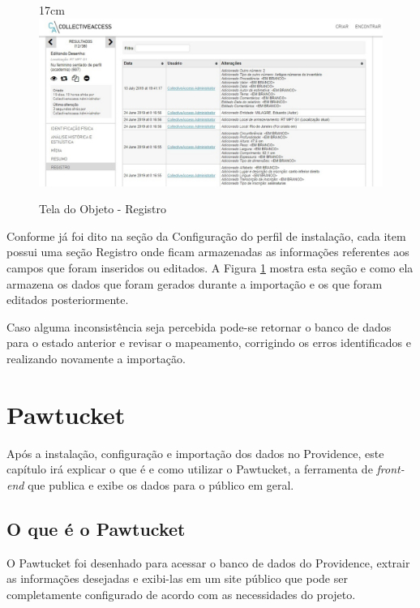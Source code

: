 \documentclass[a4paper,12pt,oneside,onecolumn,final,fleqn]{repUERJ}
\begin{document}
\begin{figure}[!ht]{17cm}
	\includegraphics[width=15cm, left]{figuras/tela_reg.jpg}
	\caption{Tela do Objeto - Registro} \label{fig:tela_reg}
\end{figure}

Conforme já foi dito na seção da Configuração do perfil de instalação, cada item possui uma seção Registro onde ficam armazenadas as informações referentes aos campos que foram inseridos ou editados. A Figura \ref{fig:tela_reg} mostra esta seção e como ela armazena os dados que foram gerados durante a importação e os que foram editados posteriormente.

Caso alguma inconsistência seja percebida pode-se retornar o banco de dados para o estado anterior e revisar o mapeamento, corrigindo os erros identificados e realizando novamente a importação.

\chapter{Pawtucket}

Após a instalação, configuração e importação dos dados no Providence, este capítulo irá explicar o que é e como utilizar o Pawtucket, a ferramenta de \textit{front-end} que publica e exibe os dados para o público em geral.

\section{O que é o Pawtucket}

O Pawtucket foi desenhado para acessar o banco de dados do Providence, extrair as informações desejadas e exibi-las em um site público que pode ser completamente configurado de acordo com as necessidades do projeto. 
\end{document}
